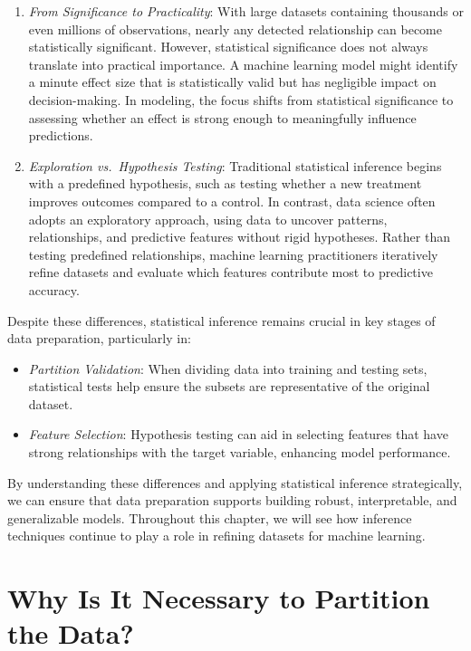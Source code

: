 \documentclass[
]{book}
\providecommand{\tightlist}{%
  \setlength{\itemsep}{0pt}\setlength{\parskip}{0pt}}
\theoremstyle{definition}
\theoremstyle{definition}
\theoremstyle{definition}
\theoremstyle{definition}
\theoremstyle{remark}
\begin{document}
\begin{enumerate}
\def\labelenumi{\arabic{enumi}.}
\item
  \emph{From Significance to Practicality}: With large datasets containing thousands or even millions of observations, nearly any detected relationship can become statistically significant. However, statistical significance does not always translate into practical importance. A machine learning model might identify a minute effect size that is statistically valid but has negligible impact on decision-making. In modeling, the focus shifts from statistical significance to assessing whether an effect is strong enough to meaningfully influence predictions.
\item
  \emph{Exploration vs.~Hypothesis Testing}: Traditional statistical inference begins with a predefined hypothesis, such as testing whether a new treatment improves outcomes compared to a control. In contrast, data science often adopts an exploratory approach, using data to uncover patterns, relationships, and predictive features without rigid hypotheses. Rather than testing predefined relationships, machine learning practitioners iteratively refine datasets and evaluate which features contribute most to predictive accuracy.
\end{enumerate}

Despite these differences, statistical inference remains crucial in key stages of data preparation, particularly in:

\begin{itemize}
\tightlist
\item
  \emph{Partition Validation}: When dividing data into training and testing sets, statistical tests help ensure the subsets are representative of the original dataset.
\item
  \emph{Feature Selection}: Hypothesis testing can aid in selecting features that have strong relationships with the target variable, enhancing model performance.
\end{itemize}

By understanding these differences and applying statistical inference strategically, we can ensure that data preparation supports building robust, interpretable, and generalizable models. Throughout this chapter, we will see how inference techniques continue to play a role in refining datasets for machine learning.

\section{Why Is It Necessary to Partition the Data?}\label{why-is-it-necessary-to-partition-the-data}
\end{document}
